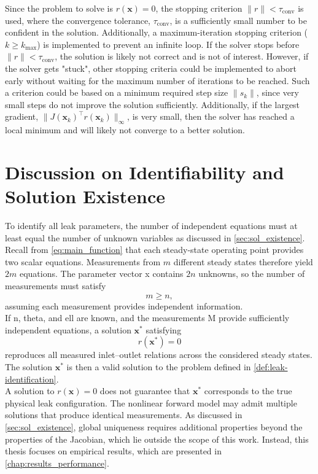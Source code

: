 Since the problem to solve is $r(\mathbf{x})=0$, the stopping criterion $\|r\|< \tau_\text{conv}$ is used, where the convergence tolerance, $\tau_\text{conv}$, is a sufficiently small number to be confident in the solution. Additionally, a maximum-iteration stopping criterion ($k \geq k_{\max}$) is implemented to prevent an infinite loop. If the solver stops before $\|r\|< \tau_\text{conv}$, the solution is likely not correct and is not of interest. However, if the solver gets "stuck", other stopping criteria could be implemented to abort early without waiting for the maximum number of iterations to be reached. Such a criterion could be based on a minimum required step size $\|s_k\|$, since very small steps do not improve the solution sufficiently. Additionally, if the largest gradient, $\|J(\mathbf{x}_k)^\top r(\mathbf{x}_k)\|_\infty$, is very small, then the solver has reached a local minimum and will likely not converge to a better solution.

\FloatBarrier

\section{Discussion on Identifiability and Solution Existence}

To identify all leak parameters, the number of independent equations must at least equal the number of unknown variables as discussed in \autoref{sec:sol_existence}. Recall from \cref{eq:main_function} that each steady-state operating point provides two scalar equations. Measurements from $m$ different steady states therefore yield $2m$ equations. The parameter vector \gls{x} contains $2n$ unknowns, so the number of measurements must satisfy
\begin{equation*}
    m \geq n,
\end{equation*}
assuming each measurement provides independent information.\\

If \gls{n}, \gls{theta}, and \gls{ell} are known, and the measurements \gls{M} provide sufficiently independent equations, a solution $\mathbf{x}^*$ satisfying
\[
r(\mathbf{x}^*) = 0
\]
reproduces all measured inlet–outlet relations across the considered steady states. The solution $\mathbf{x}^*$ is then a valid solution to the problem defined in \autoref{def:leak-identification}.\\

A solution to $r(\mathbf{x}) = 0$ does not guarantee that $\mathbf{x}^*$ corresponds to the true physical leak configuration. The nonlinear forward model may admit multiple solutions that produce identical measurements. As discussed in \autoref{sec:sol_existence}, global uniqueness requires additional properties beyond the properties of the Jacobian, which lie outside the scope of this work. Instead, this thesis focuses on empirical results, which are presented in \autoref{chap:results_performance}.